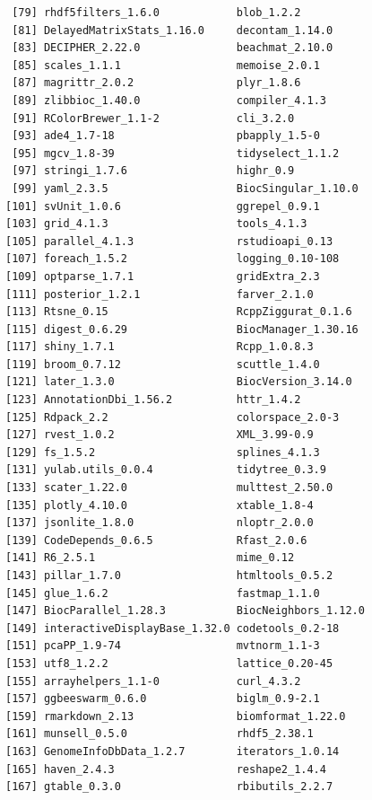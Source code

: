 \documentclass[
]{book}
\begin{document}
\begin{verbatim}
 [79] rhdf5filters_1.6.0            blob_1.2.2                   
 [81] DelayedMatrixStats_1.16.0     decontam_1.14.0              
 [83] DECIPHER_2.22.0               beachmat_2.10.0              
 [85] scales_1.1.1                  memoise_2.0.1                
 [87] magrittr_2.0.2                plyr_1.8.6                   
 [89] zlibbioc_1.40.0               compiler_4.1.3               
 [91] RColorBrewer_1.1-2            cli_3.2.0                    
 [93] ade4_1.7-18                   pbapply_1.5-0                
 [95] mgcv_1.8-39                   tidyselect_1.1.2             
 [97] stringi_1.7.6                 highr_0.9                    
 [99] yaml_2.3.5                    BiocSingular_1.10.0          
[101] svUnit_1.0.6                  ggrepel_0.9.1                
[103] grid_4.1.3                    tools_4.1.3                  
[105] parallel_4.1.3                rstudioapi_0.13              
[107] foreach_1.5.2                 logging_0.10-108             
[109] optparse_1.7.1                gridExtra_2.3                
[111] posterior_1.2.1               farver_2.1.0                 
[113] Rtsne_0.15                    RcppZiggurat_0.1.6           
[115] digest_0.6.29                 BiocManager_1.30.16          
[117] shiny_1.7.1                   Rcpp_1.0.8.3                 
[119] broom_0.7.12                  scuttle_1.4.0                
[121] later_1.3.0                   BiocVersion_3.14.0           
[123] AnnotationDbi_1.56.2          httr_1.4.2                   
[125] Rdpack_2.2                    colorspace_2.0-3             
[127] rvest_1.0.2                   XML_3.99-0.9                 
[129] fs_1.5.2                      splines_4.1.3                
[131] yulab.utils_0.0.4             tidytree_0.3.9               
[133] scater_1.22.0                 multtest_2.50.0              
[135] plotly_4.10.0                 xtable_1.8-4                 
[137] jsonlite_1.8.0                nloptr_2.0.0                 
[139] CodeDepends_0.6.5             Rfast_2.0.6                  
[141] R6_2.5.1                      mime_0.12                    
[143] pillar_1.7.0                  htmltools_0.5.2              
[145] glue_1.6.2                    fastmap_1.1.0                
[147] BiocParallel_1.28.3           BiocNeighbors_1.12.0         
[149] interactiveDisplayBase_1.32.0 codetools_0.2-18             
[151] pcaPP_1.9-74                  mvtnorm_1.1-3                
[153] utf8_1.2.2                    lattice_0.20-45              
[155] arrayhelpers_1.1-0            curl_4.3.2                   
[157] ggbeeswarm_0.6.0              biglm_0.9-2.1                
[159] rmarkdown_2.13                biomformat_1.22.0            
[161] munsell_0.5.0                 rhdf5_2.38.1                 
[163] GenomeInfoDbData_1.2.7        iterators_1.0.14             
[165] haven_2.4.3                   reshape2_1.4.4               
[167] gtable_0.3.0                  rbibutils_2.2.7              
\end{verbatim}
\end{document}
